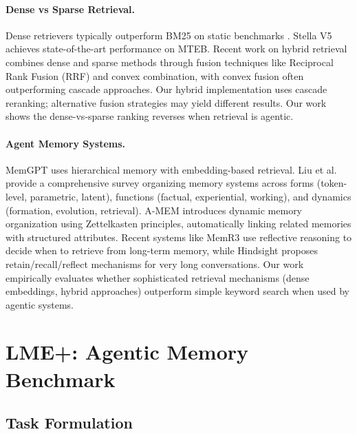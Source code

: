 \documentclass{article}
\begin{document}
\paragraph{Dense vs Sparse Retrieval.}
Dense retrievers \cite{karpukhin2020dpr, khattab2020colbert} typically outperform BM25 \cite{robertson2009bm25} on static benchmarks \cite{thakur2021beir}. Stella V5 \cite{stella2024} achieves state-of-the-art performance on MTEB. Recent work on hybrid retrieval \cite{bruch2022hybrid} combines dense and sparse methods through fusion techniques like Reciprocal Rank Fusion (RRF) and convex combination, with convex fusion often outperforming cascade approaches. Our hybrid implementation uses cascade reranking; alternative fusion strategies may yield different results. Our work shows the dense-vs-sparse ranking reverses when retrieval is agentic.

\paragraph{Agent Memory Systems.}
MemGPT \cite{packer2023memgpt} uses hierarchical memory with embedding-based retrieval. Liu et al.~\cite{liu2025memory} provide a comprehensive survey organizing memory systems across forms (token-level, parametric, latent), functions (factual, experiential, working), and dynamics (formation, evolution, retrieval). A-MEM \cite{xu2025amem} introduces dynamic memory organization using Zettelkasten principles, automatically linking related memories with structured attributes. Recent systems like MemR3 \cite{wang2025memr3} use reflective reasoning to decide when to retrieve from long-term memory, while Hindsight \cite{chen2025hindsight} proposes retain/recall/reflect mechanisms for very long conversations. Our work empirically evaluates whether sophisticated retrieval mechanisms (dense embeddings, hybrid approaches) outperform simple keyword search when used by agentic systems.

\section{LME+: Agentic Memory Benchmark}
\label{sec:method}

\subsection{Task Formulation}
\end{document}
